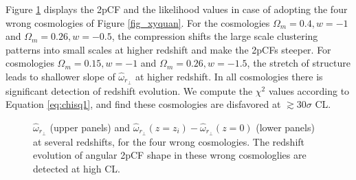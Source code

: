 \documentclass[iop]{emulateapj}
\begin{document}


Figure \ref{fig_cosmo} displays the 2pCF and the likelihood values in case of adopting 
the four wrong cosmologies of Figure \ref{fig_xyquan}.
For the cosmologies $\Omega_m=0.4,w=-1$ and $\Omega_m=0.26,w=-0.5$,
the compression shifts the large scale clustering patterns into small scales
at higher redshift and make the 2pCFs steeper.
For cosmologies $\Omega_m=0.15,w=-1$ and $\Omega_m=0.26,w=-1.5$,
the stretch of structure leads to shallower slope of $\hat{\omega}_{r_\perp}$ at higher redshift.
In all cosmologies there is significant detection of redshift evolution.
We compute the $\chi^2$ values according to Equation \ref{eq:chisq1}, 
and find these cosmologies are disfavored 
at $\gtrsim30\sigma$ CL.


\begin{figure}
   \caption{\label{fig_cosmo}
    $\hat{\omega}_{r_\perp}$ (upper panels) and $\hat{\omega}_{r_\perp}(z=z_i) - \hat{\omega}_{r_\perp}(z=0)$ (lower panels) at several redshifts,
    for the four wrong cosmologies.
    The redshift evolution of angular 2pCF shape in these wrong cosmologlies are detected at high CL.
   }
\end{figure}
\end{document}
